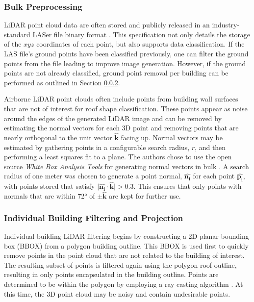 \subsubsection{Bulk Preprocessing}\label{section:lidar_preprocess}
{LiDAR point cloud data are often stored and publicly released in an industry-standard LASer file binary format \cite{samberg2007implementation}. This specification not only details the storage of the $xyz$ coordinates of each point, but also supports data classification. If the LAS file's ground points have been classified previously, one can filter the ground points from the file leading to improve image generation.} However, if the ground points are not already classified, ground point removal per building can be performed as outlined in Section \ref{section:lidar_filtering}.

{Airborne LiDAR point clouds often include points from building wall surfaces that are not of interest for roof shape classification. These points appear as noise around the edges of the generated LiDAR image and can be removed by estimating the normal vectors for each 3D point and removing points that are nearly orthogonal to the unit vector $\boldsymbol{\hat{k}}$  facing up. Normal vectors may be estimated by gathering points in a configurable search radius, $r$, and then performing a least squares fit to a plane.  The authors chose to use the open source \emph{White Box Analysis Tools} for generating normal vectors in bulk \cite{lindsay_whitebox_2016}.  A search radius of one meter was chosen to generate a point normal, $\boldsymbol{\hat{n_i}}$ for each point $\boldsymbol{\hat{p_i}}$, with points stored that satisfy $\big| \boldsymbol{\hat{n_i}} \cdot \boldsymbol{\hat{\textbf{k}}}\big| > 0.3$. This ensures that only points with normals that are within \ang{72} of $\pm \hat{\textbf{k}}$ are kept for further use.   }


\subsubsection{Individual Building Filtering and Projection}\label{section:lidar_filtering}

Individual building LiDAR filtering begins by constructing a 2D planar bounding box (BBOX) from a polygon building outline.  This BBOX is used first to quickly remove points in the point cloud that are not related to the building of interest.  The resulting subset of points is filtered again using the polygon roof outline, resulting in only points encapsulated in the building outline. Points are determined to be within the   polygon by employing a ray casting algorithm \cite{samosky_sectionviewsystem_1993}. At this time, the 3D point cloud may be noisy and contain undesirable points. 

